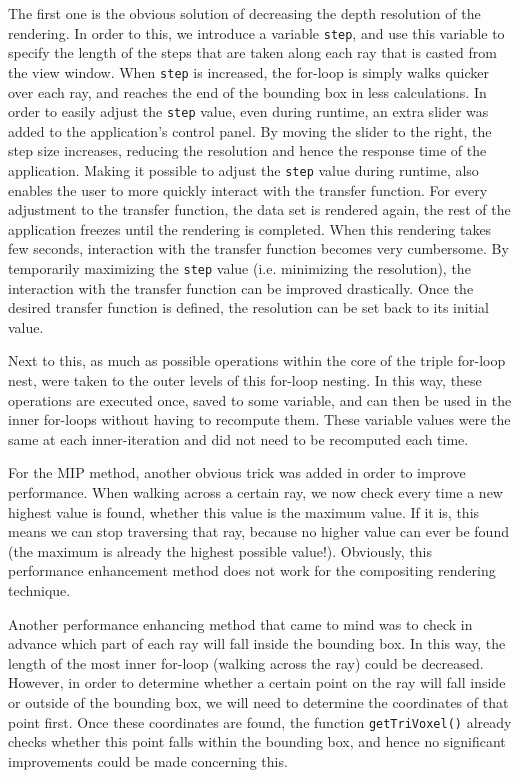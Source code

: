 The first one is the obvious solution of decreasing the depth resolution of the rendering. In order to this, we introduce a variable \texttt{step}, and use this variable to specify the length of the steps that are taken along each ray that is casted from the view window. When \texttt{step} is increased, the for-loop is simply walks quicker over each ray, and reaches the end of the bounding box in less calculations. In order to easily adjust the \texttt{step} value, even during runtime, an extra slider was added to the application's control panel. By moving the slider to the right, the step size increases, reducing the resolution and hence the response time of the application.
Making it possible to adjust the \texttt{step} value during runtime, also enables the user to more quickly interact with the transfer function. For every adjustment to the transfer function, the data set is rendered again, the rest of the application freezes until the rendering is completed. When this rendering takes few seconds, interaction with the transfer function becomes very cumbersome. By temporarily maximizing the \texttt{step} value (i.e. minimizing the resolution), the interaction with the transfer function can be improved drastically. Once the desired transfer function is defined, the resolution can be set back to its initial value.

Next to this, as much as possible operations within the core of the triple for-loop nest, were taken to the outer levels of this for-loop nesting. In this way, these operations are executed once, saved to some variable, and can then be used in the inner for-loops without having to recompute them. 
These variable values were the same at each inner-iteration and did not need to be recomputed each time.

For the MIP method, another obvious trick was added in order to improve performance. When walking across a certain ray, we now check every time a new highest value is found, whether this value is the maximum value. If it is, this means we can stop traversing that ray, because no higher value can ever be found (the maximum is already the highest possible value!). Obviously, this performance enhancement method does not work for the compositing rendering technique.

Another performance enhancing method that came to mind was to check in advance which part of each ray will fall inside the bounding box. In this way, the length of the most inner for-loop (walking across the ray) could be decreased. However, in order to determine whether a certain point on the ray will fall inside or outside of the bounding box, we will need to determine the coordinates of that point first. Once these coordinates are found, the function \texttt{getTriVoxel()} already checks whether this point falls within the bounding box, and hence no significant improvements could be made concerning this.

